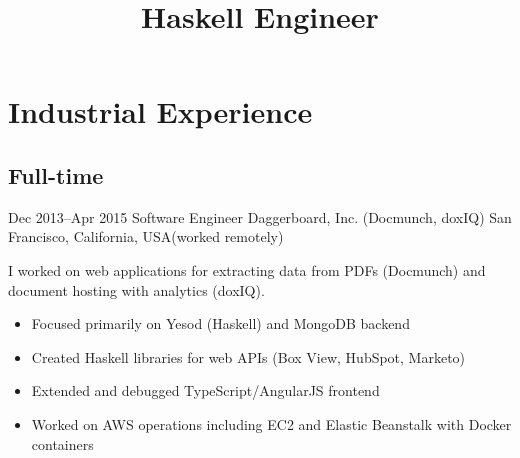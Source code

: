 \documentclass[11pt,a4paper,roman]{moderncv}
\title{Haskell Engineer}
\begin{document}
\makecvtitle



\newcommand\seeabovedesc{(\textit{See description above.})}

\newcommand\sanfrancisco{San Francisco, California, USA}
\newcommand\utrecht{Utrecht, The Netherlands}
\newcommand\austin{Austin, Texas, USA}
\newcommand\stlouis{St. Louis, Missouri, USA}
\newcommand\chippewafalls{Chippewa Falls, Wisconsin, USA}
\newcommand\whitemarsh{White Marsh, Maryland, USA}
\newcommand\altamont{Altamont, Tennessee, USA}
\newcommand\chattanooga{Chattanooga, Tennessee, USA}
\newcommand\london{London, UK}
\newcommand\centurion{Centurion, South Africa}
\newcommand\portland{Portland, Oregon, USA}

\newcommand\uu{Utrecht University}
\newcommand\wustl{Washington University in St. Louis}
\newcommand\ut{University of Texas at Austin}



\newcommand\Cpp{C{}\texttt{++}\xspace}


\section{Industrial Experience}


\subsection{Full-time}

\cventry%
{Dec 2013--Apr 2015}%
{Software Engineer}%
{Daggerboard, Inc. (Docmunch, doxIQ)}%
{\sanfrancisco (worked remotely)}%
{}%
{I worked on web applications for extracting data from PDFs (Docmunch) and document hosting with analytics (doxIQ).
\begin{itemize}
\item Focused primarily on Yesod (Haskell) and MongoDB backend
\item Created Haskell libraries for web APIs (Box View, HubSpot, Marketo)
\item Extended and debugged TypeScript/AngularJS frontend
\item Worked on AWS operations including EC2 and Elastic Beanstalk with Docker containers
\end{itemize}}
\end{document}
